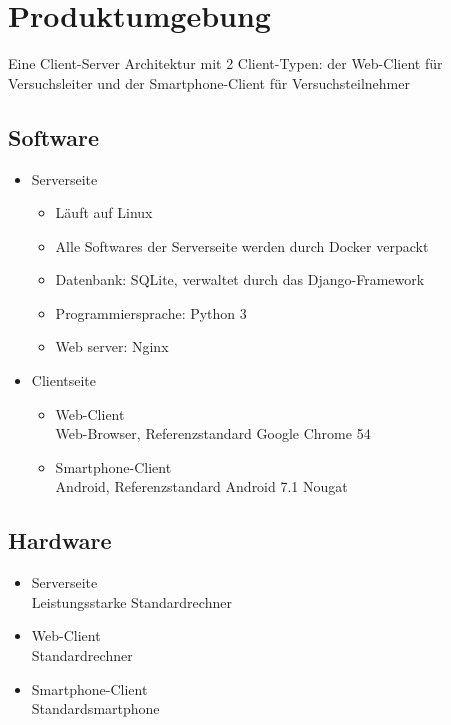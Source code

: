 \documentclass[a4paper]{scrreprt}
\begin{document}
    \chapter{Produktumgebung}
        Eine Client-Server Architektur mit 2 Client-Typen: der Web-Client für Versuchsleiter und der Smartphone-Client für Versuchsteilnehmer

        \section{Software}
            \begin{itemize}
                \item Serverseite
                    \begin{itemize}
                        \item  Läuft auf Linux
                        \item Alle Softwares der Serverseite werden durch Docker verpackt
                        \item Datenbank: SQLite, verwaltet durch das Django-Framework
                        \item Programmiersprache: Python 3
                        \item Web server: Nginx
                    \end{itemize}
                \item Clientseite
                    \begin{itemize}
                        \item Web-Client\\
                             Web-Browser, Referenzstandard Google Chrome 54
                        \item  Smartphone-Client\\
                             Android, Referenzstandard Android 7.1 Nougat
                    \end{itemize}
            \end{itemize}
 
        \section{Hardware}
            \begin{itemize}
                \item Serverseite\\
                    Leistungsstarke Standardrechner
                \item  Web-Client\\
                    Standardrechner
                \item Smartphone-Client\\
                    Standardsmartphone
            \end{itemize}
\end{document}
